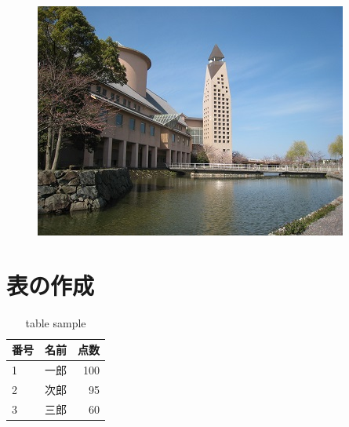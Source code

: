 \documentclass[uplatex,11pt,a4j]{jsarticle}
\begin{document}
\begin{figure}[htbp]
\begin{minipage}{0.3\hsize}
    \includegraphics[width=\hsize]{./figures/kendai_a22.jpg}
  \end{minipage}
\end{figure}

\section{表の作成}
\begin{table}[htbp]
  \caption{table sample}
  \label{tb:sample}
  \centering
  \begin{tabular}{lcr}
    \hline
    番号 & 名前 & 点数 \\
    \hline \hline
    1 & 一郎 & 100 \\
    2 & 次郎 & 95 \\
    3 & 三郎 & 60 \\
    \hline
  \end{tabular}
\end{table}
\end{document}

